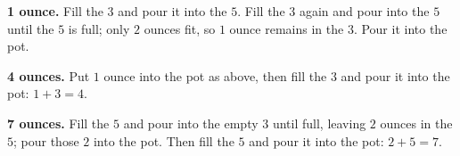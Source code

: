 \textbf{1 ounce.} Fill the $3$ and pour it into the $5$. Fill the $3$ again and pour into the $5$ until the $5$ is full; only $2$ ounces fit, so $1$ ounce remains in the $3$. Pour it into the pot.

\textbf{4 ounces.} Put $1$ ounce into the pot as above, then fill the $3$ and pour it into the pot: $1+3=4$.

\textbf{7 ounces.} Fill the $5$ and pour into the empty $3$ until full, leaving $2$ ounces in the $5$; pour those $2$ into the pot. Then fill the $5$ and pour it into the pot: $2+5=7$.
